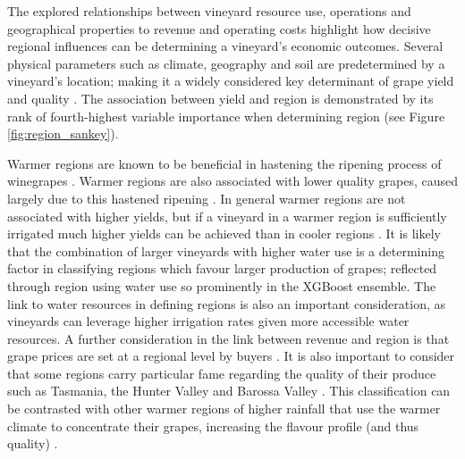 \documentclass[review,12pt,authoryear]{elsarticle}
\begin{document}
\begin{linenumbers}
The explored relationships between vineyard resource use, operations and geographical properties to revenue and operating costs highlight how decisive regional influences can be determining a vineyard's economic outcomes. Several physical parameters such as climate, geography and soil are predetermined by a vineyard's location; making it a widely considered key determinant of grape yield and quality \citep{abbalDecisionSupportSystem2016,agostaRegionalClimateVariability2012,fragaMultivariateClusteringViticultural2017}.
The association between yield and region is demonstrated by its rank of fourth-highest variable importance when determining region (see Figure \ref{fig:region_sankey}).
\par
Warmer regions are known to be beneficial in hastening the ripening process of winegrapes \citep{webbObservedTrendsWinegrape2011}. Warmer regions are also associated with lower quality grapes, caused largely due to this hastened ripening \citep{botting1996canopy}. In general warmer regions are not associated with higher yields, but if a vineyard in a warmer region is sufficiently irrigated much higher yields can be achieved than in cooler regions \citep{campsGrapeHarvestYield2012}. It is likely that the combination of larger vineyards with higher water use is a determining factor in classifying regions which favour larger production of grapes; reflected through region using water use so prominently in the XGBoost ensemble. The link to water resources in defining regions is also an important consideration, as vineyards can leverage higher irrigation rates given more accessible water resources. A further consideration in the link between revenue and region is that grape prices are set at a regional level by buyers \citep{wineaustraliaNationalVintageReport2022}. It is also important to consider that some regions carry particular fame regarding the quality of their produce such as Tasmania, the Hunter Valley and Barossa Valley \citep{hallidayAustralianWineEncyclopedia2009}. This classification can be contrasted with other warmer regions of higher rainfall that use the warmer climate to concentrate their grapes, increasing the flavour profile (and thus quality) \citep{goodwinijeriepRegulatedDeficitIrrigation1992,mgmccarthyEffectCropLoad1986}. 

\end{linenumbers}
\end{document}
